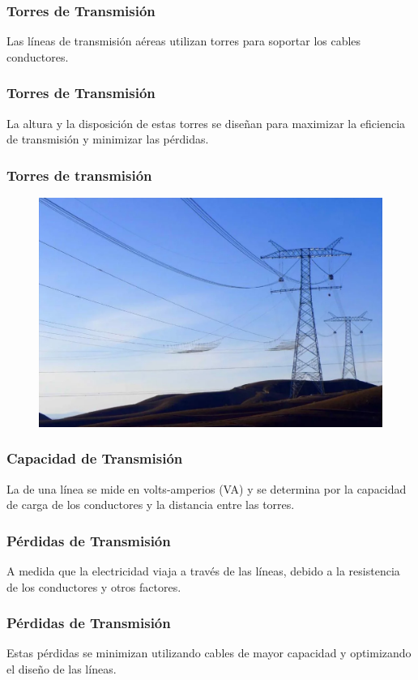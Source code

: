 \documentclass[14pt]{beamer}
\begin{document}
\begin{frame}
\frametitle{Torres de Transmisión}
Las líneas de transmisión aéreas utilizan torres para soportar los cables conductores.
\end{frame}
\begin{frame}
\frametitle{Torres de Transmisión}    
La altura y la disposición de estas torres se diseñan para maximizar la eficiencia de transmisión y minimizar las pérdidas.
\end{frame}
\begin{frame}
\frametitle{Torres de transmisión}
\vspace*{-1cm}
\begin{figure}
\centering
\includegraphics[scale=0.27]{Imagenes/Transmision_00.png}
\end{figure}
\end{frame}
\begin{frame}
\frametitle{Capacidad de Transmisión}
La  de una línea se mide en volts-amperios (VA) \pause y se determina por la capacidad de carga de los conductores y la distancia entre las torres.
\end{frame}
\begin{frame}
\frametitle{Pérdidas de Transmisión}
A medida que la electricidad viaja a través de las líneas,  debido a la resistencia de los conductores y otros factores.
\end{frame}
\begin{frame}
\frametitle{Pérdidas de Transmisión}
Estas pérdidas se minimizan utilizando cables de mayor capacidad y optimizando el diseño de las líneas.
\end{frame}
\end{document}
